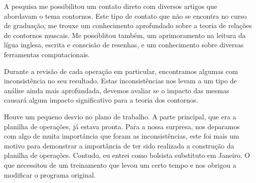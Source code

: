 \documentclass[11pt]{article}
\begin{document}
A pesquisa me possibilitou um contato direto com diversos artigos que abordavam
o tema contornos. Este tipo de contato que não se encontra no curso de graduação,
me trouxe um conhecimento aprofundado sobre a teoria de relações de contornos muscais.
Me possiblitou também, um aprimoramento na leitura da lígua inglesa, escrita e conscisão
de resenhas, e um conhecimento sobre diversas ferramentas computacionais.

Durante a revisão de cada operação em particular, encontramos algumas com inconsistência
no seu resultado. Estas inconsistências nos levam a um tipo de análise ainda mais aprofundada,
devemos avaliar se o impacto das mesmas causará algum impacto significativo para a teoria dos contornos.

Houve um pequeno desvio no plano de trabalho. A parte principal, que era a planilha de operações, 
já estava pronta. Para a nossa surpresa, nos deparamos com algo de muita importância que foram 
as inconsistências, este foi mais um motivo para demonstrar a importância de ter sido realizada a construção 
da planilha de operações. Contudo, eu entrei como bolsista substituto em Janeiro. O que necessitou de um 
treinamento que levou um certo tempo e nos obrigou a modificar o programa original.






\renewcommand{\refname}{Referências bibliográficas (máximo 15)}

\nocite{
  Friedmann1985,
  Friedmann1987,
  Morris1987,
  Marvin1988,
  Polansky1992,
  Morris1993,
  Clifford1995,
  Quinn1997,
  Beard2003,
  Sampaio2008,
  Schultz2008,
  Schultz2009,
  Bor2009
}





\end{document}
